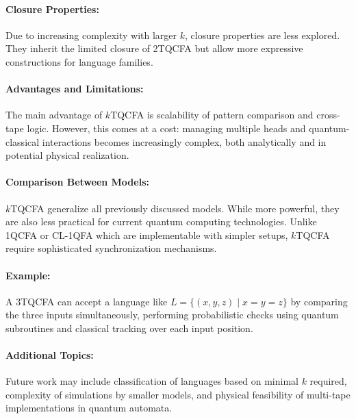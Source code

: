 \paragraph{Closure Properties:}  
Due to increasing complexity with larger $k$, closure properties are less explored. They inherit the limited closure of 2TQCFA but allow more expressive constructions for language families.

\paragraph{Advantages and Limitations:}  
The main advantage of $k$TQCFA is scalability of pattern comparison and cross-tape logic. However, this comes at a cost: managing multiple heads and quantum-classical interactions becomes increasingly complex, both analytically and in potential physical realization.

\paragraph{Comparison Between Models:}  
$k$TQCFA generalize all previously discussed models. While more powerful, they are also less practical for current quantum computing technologies. Unlike 1QCFA or CL-1QFA which are implementable with simpler setups, $k$TQCFA require sophisticated synchronization mechanisms.

\paragraph{Example:}  
A 3TQCFA can accept a language like $L = \{ (x, y, z) \mid x = y = z \}$ by comparing the three inputs simultaneously, performing probabilistic checks using quantum subroutines and classical tracking over each input position.

\paragraph{Additional Topics:}  
Future work may include classification of languages based on minimal $k$ required, complexity of simulations by smaller models, and physical feasibility of multi-tape implementations in quantum automata.
